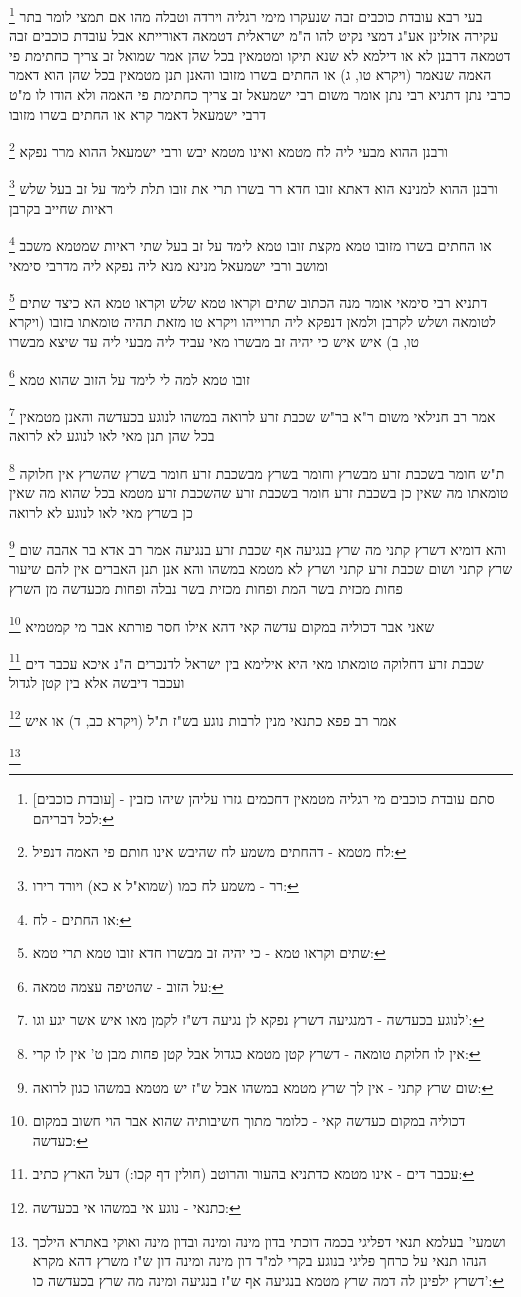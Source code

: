 \documentclass[12pt, openany]{book}
\newcommand{\footnotecomment}[1]{
	\renewcommand\thefootnote{}
	\footnote{#1}}
\newcommand{\commenta}[1]{\footnotecomment{#1}}
\begin{document}
{{\commenta{[עובדת כוכבים] - סתם עובדת כוכבים מי רגליה מטמאין דחכמים גזרו עליהן שיהו כזבין לכל דבריהם:}
בעי רבא עובדת כוכבים זבה שנעקרו מימי רגליה
וירדה וטבלה מהו 
אם תמצי לומר בתר עקירה אזלינן אע"ג דמצי נקיט להו ה"מ ישראלית דטמאה דאורייתא אבל עובדת כוכבים זבה דטמאה דרבנן לא או דילמא לא שנא תיקו
ומטמאין בכל שהן אמר שמואל זב צריך כחתימת פי האמה שנאמר (ויקרא טו, ג) או החתים בשרו מזובו 
והאנן תנן מטמאין בכל שהן הוא דאמר כרבי נתן דתניא רבי נתן אומר משום רבי ישמעאל זב צריך כחתימת פי האמה ולא הודו לו 
מ"ט דרבי ישמעאל דאמר קרא או החתים בשרו מזובו 
\commenta{לח מטמא - דהחתים משמע לח שהיבש אינו חותם פי האמה דנפיל:}
ורבנן ההוא מבעי ליה לח מטמא ואינו מטמא יבש 
ורבי ישמעאל ההוא מרר נפקא 
\commenta{רר - משמע לח כמו (שמוא"ל א כא) ויורד רירו:}
ורבנן ההוא למנינא הוא דאתא זובו חדא רר בשרו תרי את זובו תלת לימד על זב בעל שלש ראיות שחייב בקרבן 
\commenta{או החתים - לח:}
או החתים בשרו מזובו טמא מקצת זובו טמא לימד על זב בעל שתי ראיות שמטמא משכב ומושב ורבי ישמעאל מנינא מנא ליה נפקא ליה מדרבי סימאי
\commenta{שתים וקראו טמא - כי יהיה זב מבשרו חדא זובו טמא תרי טמא:}
דתניא רבי סימאי אומר מנה הכתוב שתים וקראו טמא שלש וקראו טמא הא כיצד שתים לטומאה ושלש לקרבן 
ולמאן דנפקא ליה תרוייהו {ויקרא טו } מזאת תהיה טומאתו בזובו (ויקרא טו, ב) איש איש כי יהיה זב מבשרו מאי עביד ליה מבעי ליה עד שיצא מבשרו 
\commenta{על הזוב - שהטיפה עצמה טמאה:}
זובו טמא למה לי לימד על הזוב שהוא טמא 
\commenta{לנוגע בכעדשה - דמנגיעה דשרץ נפקא לן נגיעה דש"ז לקמן מאו איש אשר יגע וגו':}
אמר רב חנילאי משום ר"א בר"ש שכבת זרע לרואה במשהו לנוגע בכעדשה והאנן מטמאין בכל שהן תנן מאי לאו לנוגע לא לרואה 
\commenta{אין לו חלוקת טומאה - דשרץ קטן מטמא כגדול אבל קטן פחות מבן ט' אין לו קרי:}
ת"ש חומר בשכבת זרע מבשרץ וחומר בשרץ מבשכבת זרע חומר בשרץ שהשרץ אין חלוקה טומאתו מה שאין כן בשכבת זרע חומר בשכבת זרע שהשכבת זרע מטמא בכל שהוא מה שאין כן בשרץ 
מאי לאו לנוגע  לא לרואה 
\commenta{שום שרץ קתני - אין לך שרץ מטמא במשהו אבל ש"ז יש מטמא במשהו כגון לרואה:}
והא דומיא דשרץ קתני מה שרץ בנגיעה אף שכבת זרע בנגיעה אמר רב אדא בר אהבה שום שרץ קתני ושום שכבת זרע קתני 
ושרץ לא מטמא במשהו והא אנן תנן האברים אין להם שיעור פחות מכזית בשר המת ופחות מכזית בשר נבלה ופחות מכעדשה מן השרץ 
\commenta{דכוליה במקום כעדשה קאי - כלומר מתוך חשיבותיה שהוא אבר הוי חשוב במקום כעדשה:}
שאני אבר דכוליה במקום עדשה קאי דהא אילו חסר פורתא אבר מי קמטמיא 
\commenta{עכבר דים - אינו מטמא כדתניא בהעור והרוטב (חולין דף קכו:) דעל הארץ כתיב:}
שכבת זרע דחלוקה טומאתו מאי היא אילימא בין ישראל לדנכרים ה"נ איכא עכבר דים ועכבר דיבשה 
אלא בין קטן לגדול 
\commenta{כתנאי - נוגע אי במשהו אי בכעדשה:}
אמר רב פפא כתנאי מנין לרבות נוגע בש"ז ת"ל (ויקרא כב, ד) או איש 
\commenta{ושמעי' בעלמא תנאי דפליגי בכמה דוכתי בדון מינה ומינה ובדון מינה ואוקי באתרא הילכך הנהו תנאי על כרחך פליגי בנוגע בקרי למ"ד דון מינה ומינה דון ש"ז משרץ דהא מקרא דשרץ ילפינן לה דמה שרץ מטמא בנגיעה אף ש"ז בנגיעה ומינה מה שרץ בכעדשה כו':}
}}
\end{document}
